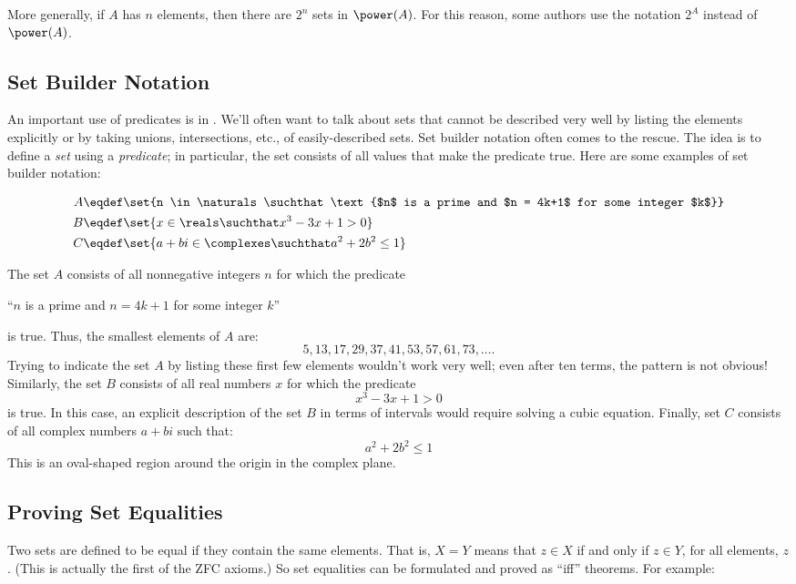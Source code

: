 More generally, if $A$ has $n$ elements, then there are $2^n$ sets in
$\power(A)$.  For this reason, some authors use the notation $2^A$ instead
of $\power(A)$.

\subsection{Set Builder Notation}

An important use of predicates is in .  We'll
often want to talk about sets that cannot be described very well by
listing the elements explicitly or by taking unions, intersections,
etc., of easily-described sets.  Set builder notation often comes to the
rescue.  The idea is to define a \textit{set} using a \textit{predicate};
in particular, the set consists of all values that make the predicate
true.  Here are some examples of set builder notation:

\begin{align*}
A & \eqdef \set{n \in \naturals \suchthat \text{$n$ is a prime and $n =
    4k+1$ for some integer $k$}} \\
B & \eqdef \set{x \in \reals \suchthat x^3 - 3 x + 1 > 0} \\
C & \eqdef \set{a + b i \in \complexes \suchthat a^2 + 2 b^2 \leq 1}
\end{align*}

The set $A$ consists of all nonnegative integers $n$ for which the
predicate
\begin{center}
``$n$ is a prime and $n = 4k+1$ for some integer $k$''
\end{center}
is true.  Thus, the smallest elements of $A$ are:
\[
5, 13, 17, 29, 37, 41, 53, 57, 61, 73, \ldots.
\]
Trying to indicate the set $A$ by listing these first few elements
wouldn't work very well; even after ten terms, the pattern is not
obvious!  Similarly, the set $B$ consists of all real numbers $x$ for
which the predicate
\[
x^3 - 3x + 1 > 0
\]
is true.  In this case, an explicit description of the set $B$ in
terms of intervals would require solving a cubic equation.  Finally,
set $C$ consists of all complex numbers $a + b i$ such that:
\[
a^2 + 2 b^2 \leq 1
\]
This is an oval-shaped region around the origin in the complex plane.

\subsection{Proving Set Equalities}

Two sets are defined to be equal if they contain the same elements.  That
is, $X = Y$ means that $z \in X$ if and only if $z \in Y$, for all
elements, $z$.  (This is actually the first of the ZFC axioms.)  So set
equalities can be formulated and proved as ``iff'' theorems.  For
example:

